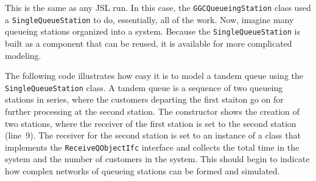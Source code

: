 \documentclass[
]{book}
\theoremstyle{definition}
\theoremstyle{definition}
\theoremstyle{definition}
\theoremstyle{definition}
\theoremstyle{remark}
\begin{document}
This is the same as any JSL run. In this case, the \texttt{GGCQueueingStation} class used a
\texttt{SingleQueueStation} to do, essentially, all of the work. Now, imagine
many queueing stations organized into a system. Because the
\texttt{SingleQueueStation} is built as a component that can be reused, it is
available for more complicated modeling.

The following code illustrates how easy it is to model a
tandem queue using the \texttt{SingleQueueStation} class. A tandem queue is a
sequence of two queueing stations in series, where the customers
departing the first staiton go on for further processing at the second
station. The constructor shows the creation of two
stations, where the receiver of the first station is set to the second
station (line~9). The receiver for the second station is set to an
instance of a class that implements the \texttt{ReceiveQObjectIfc} interface and
collects the total time in the system and the number of customers in the
system. This should begin to indicate how complex networks of queueing
stations can be formed and simulated.
\end{document}
